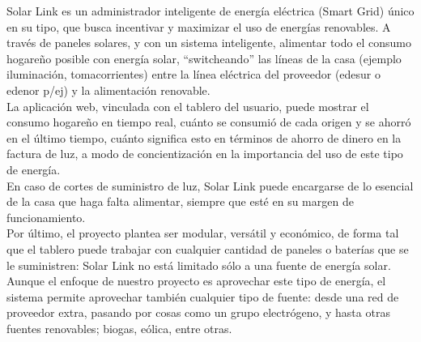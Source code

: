 Solar Link es un administrador inteligente de energía eléctrica (Smart Grid) único en su tipo, que busca incentivar y maximizar el uso de energías renovables. A través de paneles solares, y con un sistema inteligente, alimentar todo el consumo hogareño posible con energía solar, “switcheando” las líneas de la casa (ejemplo iluminación, tomacorrientes) entre la línea eléctrica del proveedor (edesur o edenor p/ej) y la alimentación renovable.\\

La aplicación web, vinculada con el tablero del usuario, puede mostrar el consumo hogareño en tiempo real, cuánto se consumió de cada origen y se ahorró en el último tiempo, cuánto significa esto en términos de ahorro de dinero en la factura de luz, a modo de concientización en la importancia del uso de este tipo de energía.\\

En caso de cortes de suministro de luz, Solar Link puede encargarse de lo esencial de la casa que haga falta alimentar, siempre que esté en su margen de funcionamiento. \\

Por último, el proyecto plantea ser modular, versátil y económico, de forma tal que el tablero puede trabajar con cualquier cantidad de paneles o baterías que se le suministren: Solar Link no está limitado sólo a una fuente de energía solar. Aunque el enfoque de nuestro proyecto es aprovechar este tipo de energía, el sistema permite aprovechar también cualquier tipo de fuente: desde una red de proveedor extra, pasando por cosas como un grupo electrógeno, y hasta otras fuentes renovables; biogas, eólica, entre otras. \\
